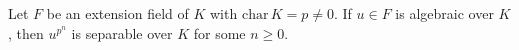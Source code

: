 Let $F$ be an extension field of $K$ with $\mathrm{char}\,K = p \neq 0$. If $u \in F$ is algebraic over $K$, then $u^{p^n}$ is separable over $K$ for some $n \geq 0$.
